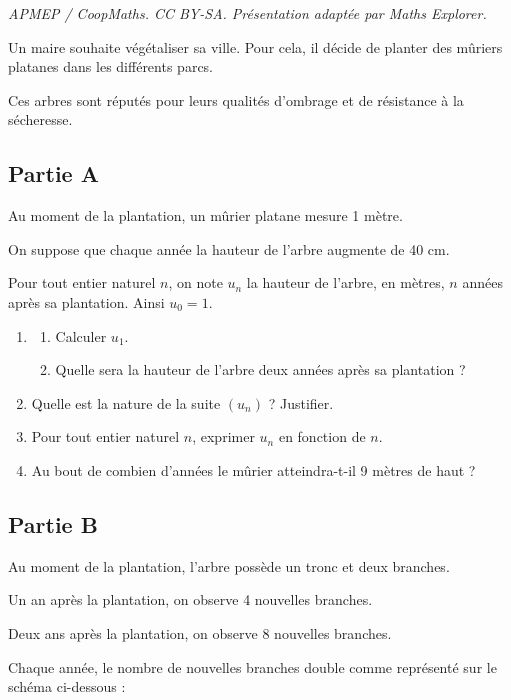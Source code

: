 \documentclass[10pt]{article}
\begin{document}
\noindent\textit{APMEP / CoopMaths. CC BY-SA. Présentation adaptée par Maths Explorer.}\par\medskip
Un maire souhaite végétaliser sa ville. Pour cela, il décide de planter des mûriers platanes dans les différents parcs.

Ces arbres sont réputés pour leurs qualités d'ombrage et de résistance à la sécheresse.

\subsection*{Partie A}

Au moment de la plantation, un mûrier platane mesure 1 mètre.

On suppose que chaque année la hauteur de l'arbre augmente de 40 cm.

Pour tout entier naturel $n$, on note $u_n$ la hauteur de l'arbre, en mètres, $n$ années après sa plantation. Ainsi $u_0=1$.

\begin{enumerate}
\item \begin{enumerate}
\item Calculer $u_1$.
\item Quelle sera la hauteur de l'arbre deux années après sa plantation ?
\end{enumerate}
\item Quelle est la nature de la suite $(u_n)$ ? Justifier.
\item Pour tout entier naturel $n$, exprimer $u_n$ en fonction de $n$.
\item Au bout de combien d'années le mûrier atteindra-t-il 9 mètres de haut ?
\end{enumerate}


\subsection*{Partie B}

Au moment de la plantation, l'arbre possède un tronc et deux branches.

Un an après la plantation, on observe 4 nouvelles branches.

Deux ans après la plantation, on observe 8 nouvelles branches.

Chaque année, le nombre de nouvelles branches double comme représenté sur le schéma ci-dessous :
\end{document}
